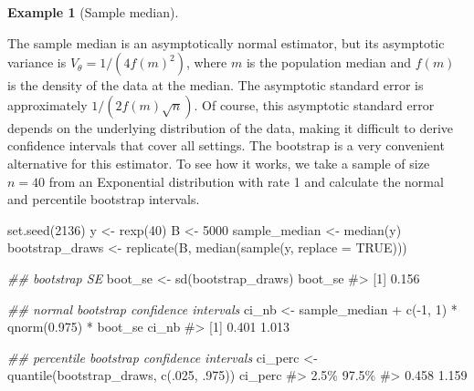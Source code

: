 \documentclass[
  13pt,
  letterpaper,
  DIV=11,
  numbers=noendperiod]{scrreprt}
\newenvironment{Shaded}{\begin{snugshade}}{\end{snugshade}}
\newcommand{\AttributeTok}[1]{\textcolor[rgb]{0.40,0.45,0.13}{#1}}
\newcommand{\CommentTok}[1]{\textcolor[rgb]{0.37,0.37,0.37}{#1}}
\newcommand{\ConstantTok}[1]{\textcolor[rgb]{0.56,0.35,0.01}{#1}}
\newcommand{\DecValTok}[1]{\textcolor[rgb]{0.68,0.00,0.00}{#1}}
\newcommand{\DocumentationTok}[1]{\textcolor[rgb]{0.37,0.37,0.37}{\textit{#1}}}
\newcommand{\FloatTok}[1]{\textcolor[rgb]{0.68,0.00,0.00}{#1}}
\newcommand{\FunctionTok}[1]{\textcolor[rgb]{0.28,0.35,0.67}{#1}}
\newcommand{\NormalTok}[1]{\textcolor[rgb]{0.00,0.23,0.31}{#1}}
\newcommand{\OtherTok}[1]{\textcolor[rgb]{0.00,0.23,0.31}{#1}}
\newcommand{\SpecialCharTok}[1]{\textcolor[rgb]{0.37,0.37,0.37}{#1}}
\theoremstyle{plain}
\theoremstyle{plain}
\theoremstyle{definition}
\theoremstyle{definition}
\newtheorem{example}{Example}[chapter]
\theoremstyle{remark}
\begin{document}
\begin{example}[Sample
median]\protect\hypertarget{exm-bootstrap-median}{}\label{exm-bootstrap-median}

The sample median is an asymptotically normal estimator, but its
asymptotic variance is \(V_{\theta} = 1/(4f(m)^2)\), where \(m\) is the
population median and \(f(m)\) is the density of the data at the median.
The asymptotic standard error is approximately \(1/(2f(m)\sqrt{n})\). Of
course, this asymptotic standard error depends on the underlying
distribution of the data, making it difficult to derive confidence
intervals that cover all settings. The bootstrap is a very convenient
alternative for this estimator. To see how it works, we take a sample of
size \(n=40\) from an Exponential distribution with rate 1 and calculate
the normal and percentile bootstrap intervals.

\begin{Shaded}
\begin{Highlighting}[]
\FunctionTok{set.seed}\NormalTok{(}\DecValTok{2136}\NormalTok{)}
\NormalTok{y }\OtherTok{\textless{}{-}} \FunctionTok{rexp}\NormalTok{(}\DecValTok{40}\NormalTok{)}
\NormalTok{B }\OtherTok{\textless{}{-}} \DecValTok{5000}
\NormalTok{sample\_median }\OtherTok{\textless{}{-}} \FunctionTok{median}\NormalTok{(y)}
\NormalTok{bootstrap\_draws }\OtherTok{\textless{}{-}} \FunctionTok{replicate}\NormalTok{(B, }\FunctionTok{median}\NormalTok{(}\FunctionTok{sample}\NormalTok{(y, }\AttributeTok{replace =} \ConstantTok{TRUE}\NormalTok{)))}

\DocumentationTok{\#\# bootstrap SE}
\NormalTok{boot\_se }\OtherTok{\textless{}{-}} \FunctionTok{sd}\NormalTok{(bootstrap\_draws)}
\NormalTok{boot\_se}
\CommentTok{\#\textgreater{} [1] 0.156}

\DocumentationTok{\#\# normal bootstrap confidence intervals}
\NormalTok{ci\_nb }\OtherTok{\textless{}{-}}\NormalTok{ sample\_median }\SpecialCharTok{+} \FunctionTok{c}\NormalTok{(}\SpecialCharTok{{-}}\DecValTok{1}\NormalTok{, }\DecValTok{1}\NormalTok{) }\SpecialCharTok{*} \FunctionTok{qnorm}\NormalTok{(}\FloatTok{0.975}\NormalTok{) }\SpecialCharTok{*}\NormalTok{ boot\_se}
\NormalTok{ci\_nb}
\CommentTok{\#\textgreater{} [1] 0.401 1.013}

\DocumentationTok{\#\# percentile bootstrap confidence intervals}
\NormalTok{ci\_perc }\OtherTok{\textless{}{-}} \FunctionTok{quantile}\NormalTok{(bootstrap\_draws, }\FunctionTok{c}\NormalTok{(.}\DecValTok{025}\NormalTok{, .}\DecValTok{975}\NormalTok{))}
\NormalTok{ci\_perc}
\CommentTok{\#\textgreater{}  2.5\% 97.5\% }
\CommentTok{\#\textgreater{} 0.458 1.159}
\end{Highlighting}
\end{Shaded}


\end{example}
\end{document}
